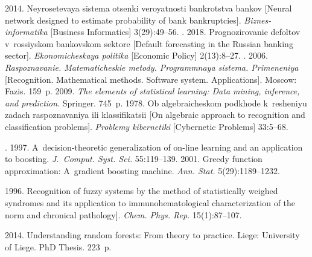  \begin{multicols}{2}

\renewcommand{\bibname}{\protect\rmfamily References}

{\small\frenchspacing
 {%
 \begin{thebibliography}{9}
 2014. Neyrosetevaya  
sistema otsenki veroyatnosti bankrotstva bankov [Neural network designed 
to estimate probability of bank bankruptcies]. \textit{Biznes-informatika} [Business Informatics] 
3(29):49--56.
. 2018. 
Prognozirovanie defoltov v~rossiyskom bankovskom sektore [Default 
forecasting in the Russian banking sector]. \textit{Ekonomicheskaya politika}
[Economic Policy] 2(13):8--27.
. 2006. \textit{Raspoznavanie. 
Matematicheskie metody. Programmnaya sistema. Primeneniya} 
[Recognition. Mathematical methods. Software system. Applications].
Moscow: Fazis. 159~p.
 2009. 
\textit{The elements of statistical 
learning: Data mining, inference, and prediction}. Springer. 745~p.
 1978. Ob algebraicheskom podkhode k~re\-she\-niyu zadach 
raspoznavaniya ili klassifikatsii [On algebraic approach to recognition and 
classification problems]. \textit{Problemy kibernetiki} [Cybernetic Problems] 
33:5--68.

. 1997. A~decision-theoretic generalization of 
on-line learning and an application to boosting. \textit{J.~Comput. Syst. Sci.} 
55:119--139.
 2001. Greedy function approximation: A~gradient boosting 
machine. \textit{Ann. Stat.} 5(29):1189--1232.

 1996. 
Recognition of fuzzy systems by the method of 
statistically weighed syndromes and its application to immunohematological 
characterization of the
norm and chronical pathology]. \textit{Chem. Phys. Rep.} 
15(1):87--107.

 2014. Understanding random forests: From theory to 
practice.  Liege: University of Liege.  PhD Thesis. 223~p.
 \end{thebibliography}

 }
 }

\end{multicols}

